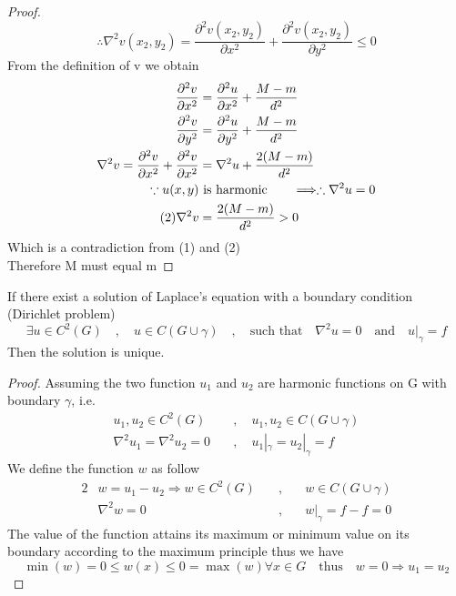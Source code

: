 \documentclass[]{article}
\begin{document}
\begin{proof}
\[    \]
    \setcounter{equation}{0}
    \begin{equation}
        \therefore  \nabla^2 v(x_2,y_2) =  \frac{\partial^2 v(x_2,y_2)}{\partial x^2}+\frac{\partial^2 v(x_2,y_2)}{\partial y^2} \leq 0
    \end{equation}
    From the definition of v we obtain
    \begin{align*}
        \frac{\partial^2 v}{\partial x^2} &= \frac{\partial^2 u}{\partial x^2} + \frac{M-m}{d^2}
        \\
        \frac{\partial^2 v}{\partial y^2} &= \frac{\partial^2 u}{\partial y^2} + \frac{M-m}{d^2}
        \\
        \nabla^2 v = \frac{\partial^2 v}{\partial x^2} + \frac{\partial^2 v}{\partial x^2} &= \nabla^2 u + \frac{2(M-m)}{d^2}
        \\
        \because u(x,y) &\text{ is harmonic}\quad\quad \Longrightarrow \therefore \nabla^2 u = 0
        \\\tag{2}
        \nabla^2 v &= \frac{2(M-m)}{d^2} > 0 
    \end{align*}
    Which is a contradiction from (1) and (2)
    \\
    Therefore M must equal m 
\end{proof}
\begin{theorem}
    If there exist a solution of Laplace's equation 
    with a boundary condition (Dirichlet problem)
    \[
    \exists u \in C^2(G) \quad,\quad u \in C(G \cup \gamma) \quad,\quad \text{such that} \quad \nabla^2 u =0 \quad \text{and} \quad u|_\gamma = f
    \]
    Then the solution is unique.
\end{theorem}
\begin{proof}
Assuming the two function $u_1$ and $u_2$ are harmonic functions on G with boundary $\gamma$, i.e. 
\begin{align*}
    u_1 ,u_2 \in C^2(G) \quad&,\quad u_1 , u_2 \in C(G \cup \gamma)
    \\
    \nabla^2 u_1 = \nabla^2 u_2 =0 \quad&,\quad u_1|_\gamma = u_2|_\gamma = f    
\end{align*}
We define the function $w$ as follow
\begin{alignat*}{2}
    &w = u_1-u_2 \Rightarrow w\in C^2(G) \quad&,\quad &w \in C(G \cup \gamma)
    \\
    &\nabla^2 w =0 \quad&,\quad &w|_\gamma = f-f = 0
\end{alignat*}
The value of the function attains its maximum or minimum value on its boundary according to the maximum principle thus we have
\[
    \min(w) = 0 \leq w(x) \leq 0= \max(w) \forall x \in G \quad \text{thus} \quad w = 0 \Rightarrow u_1 = u_2     
\]
\end{proof}
\end{document}
